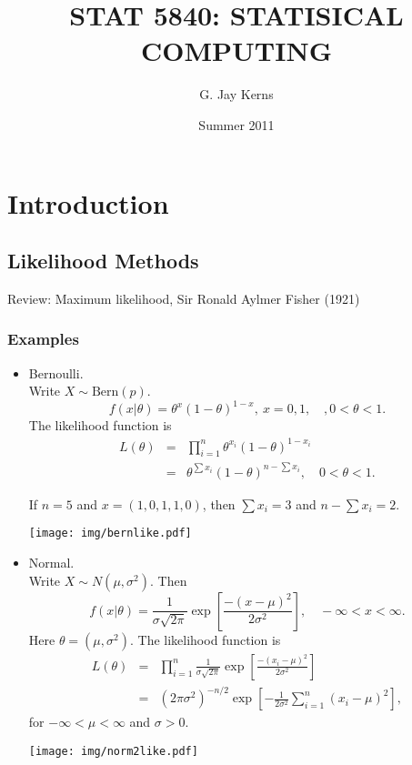 \documentclass[captions=tableheading]{scrbook}
\title{\fontsize{30}{35}\selectfont STAT 5840: STATISICAL COMPUTING}
\author{G. Jay Kerns}
\date{Summer 2011}
\begin{document}
\maketitle




\chapter{Introduction}
\label{sec-1}
\section{Likelihood Methods}
\label{sec-1_1}


Review: Maximum likelihood, Sir Ronald Aylmer Fisher (1921)
\subsection{Examples}
\label{sec-1_1_1}
\begin{itemize}

\item Bernoulli.\\
\label{sec-1_1_1_1}%
Write $X \sim \mathrm{Bern}(p)$.
\[
f(x|\theta) = \theta^{x}(1-\theta)^{1-x},\ x=0,1,\quad, 0 < \theta < 1.
\]
The likelihood function is
\begin{eqnarray*}
L(\theta) & = & \prod_{i=1}^{n}\theta^{x_{i}}(1-\theta)^{1-x_{i}}\\
 & = & \theta^{\sum x_{i}}(1-\theta)^{n-\sum x_{i}},\quad0<\theta<1.
\end{eqnarray*}

If $n = 5$ and $x = (1,0,1,1,0)$, then $\sum x_{i}=3$ and $n - \sum x_{i}=2$.

\begin{center}

\texttt{[image: img/bernlike.pdf]}

\end{center}


\item Normal.\\
\label{sec-1_1_1_2}%
Write $X\sim N(\mu,\sigma^2)$. Then 
\[
f(x|\theta) = \frac{1}{\sigma\sqrt{2\pi}}\exp\left[\frac{-(x-\mu)^{2}}{2\sigma^{2}}\right],\quad-\infty<x<\infty.
\]
Here $\theta = (\mu,\sigma^2)$.  The likelihood function is
\begin{eqnarray*}
L(\theta) & = & \prod_{i=1}^{n}\frac{1}{\sigma\sqrt{2\pi}}\exp\left[\frac{-(x_{i}-\mu)^{2}}{2\sigma^{2}}\right]\\
 & = & (2\pi\sigma^{2})^{-n/2}\exp\left[-\frac{1}{2\sigma^{2}}\sum_{i=1}^{n}(x_{i}-\mu)^{2}\right],
\end{eqnarray*}
for $-\infty < \mu < \infty$ and $\sigma > 0$.

\begin{center}

\texttt{[image: img/norm2like.pdf]}

\end{center}

\end{itemize} %
\end{document}
